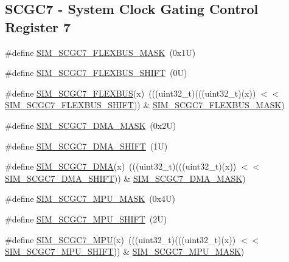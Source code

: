 \subsection*{S\+C\+G\+C7 -\/ System Clock Gating Control Register 7}
\begin{DoxyCompactItemize}
\item 
\#define \mbox{\hyperlink{group___s_i_m___register___masks_ga93f819afb387ad8aa57896e43ab0e795}{S\+I\+M\+\_\+\+S\+C\+G\+C7\+\_\+\+F\+L\+E\+X\+B\+U\+S\+\_\+\+M\+A\+SK}}~(0x1\+U)
\item 
\#define \mbox{\hyperlink{group___s_i_m___register___masks_ga624734f9006b5f488a9e1f789e1e3bde}{S\+I\+M\+\_\+\+S\+C\+G\+C7\+\_\+\+F\+L\+E\+X\+B\+U\+S\+\_\+\+S\+H\+I\+FT}}~(0\+U)
\item 
\#define \mbox{\hyperlink{group___s_i_m___register___masks_ga05d79d2b7b64bc3b4fa7c67b30fd5da3}{S\+I\+M\+\_\+\+S\+C\+G\+C7\+\_\+\+F\+L\+E\+X\+B\+US}}(x)~(((uint32\+\_\+t)(((uint32\+\_\+t)(x)) $<$$<$ \mbox{\hyperlink{group___s_i_m___register___masks_ga624734f9006b5f488a9e1f789e1e3bde}{S\+I\+M\+\_\+\+S\+C\+G\+C7\+\_\+\+F\+L\+E\+X\+B\+U\+S\+\_\+\+S\+H\+I\+FT}})) \& \mbox{\hyperlink{group___s_i_m___register___masks_ga93f819afb387ad8aa57896e43ab0e795}{S\+I\+M\+\_\+\+S\+C\+G\+C7\+\_\+\+F\+L\+E\+X\+B\+U\+S\+\_\+\+M\+A\+SK}})
\item 
\#define \mbox{\hyperlink{group___s_i_m___register___masks_gac559e129885604991932101719e3b368}{S\+I\+M\+\_\+\+S\+C\+G\+C7\+\_\+\+D\+M\+A\+\_\+\+M\+A\+SK}}~(0x2\+U)
\item 
\#define \mbox{\hyperlink{group___s_i_m___register___masks_ga1113f1622eb2e4099653e93943a89c6e}{S\+I\+M\+\_\+\+S\+C\+G\+C7\+\_\+\+D\+M\+A\+\_\+\+S\+H\+I\+FT}}~(1\+U)
\item 
\#define \mbox{\hyperlink{group___s_i_m___register___masks_gab654fa6242c7052090ea5e5aae4e5b18}{S\+I\+M\+\_\+\+S\+C\+G\+C7\+\_\+\+D\+MA}}(x)~(((uint32\+\_\+t)(((uint32\+\_\+t)(x)) $<$$<$ \mbox{\hyperlink{group___s_i_m___register___masks_ga1113f1622eb2e4099653e93943a89c6e}{S\+I\+M\+\_\+\+S\+C\+G\+C7\+\_\+\+D\+M\+A\+\_\+\+S\+H\+I\+FT}})) \& \mbox{\hyperlink{group___s_i_m___register___masks_gac559e129885604991932101719e3b368}{S\+I\+M\+\_\+\+S\+C\+G\+C7\+\_\+\+D\+M\+A\+\_\+\+M\+A\+SK}})
\item 
\#define \mbox{\hyperlink{group___s_i_m___register___masks_ga10319f9b82c284e2b8c0dbe633a8cc47}{S\+I\+M\+\_\+\+S\+C\+G\+C7\+\_\+\+M\+P\+U\+\_\+\+M\+A\+SK}}~(0x4\+U)
\item 
\#define \mbox{\hyperlink{group___s_i_m___register___masks_ga6e29c9922d73e340397f527f22dccd97}{S\+I\+M\+\_\+\+S\+C\+G\+C7\+\_\+\+M\+P\+U\+\_\+\+S\+H\+I\+FT}}~(2\+U)
\item 
\#define \mbox{\hyperlink{group___s_i_m___register___masks_gaa58dead9b7b361b440f4758f8206d15c}{S\+I\+M\+\_\+\+S\+C\+G\+C7\+\_\+\+M\+PU}}(x)~(((uint32\+\_\+t)(((uint32\+\_\+t)(x)) $<$$<$ \mbox{\hyperlink{group___s_i_m___register___masks_ga6e29c9922d73e340397f527f22dccd97}{S\+I\+M\+\_\+\+S\+C\+G\+C7\+\_\+\+M\+P\+U\+\_\+\+S\+H\+I\+FT}})) \& \mbox{\hyperlink{group___s_i_m___register___masks_ga10319f9b82c284e2b8c0dbe633a8cc47}{S\+I\+M\+\_\+\+S\+C\+G\+C7\+\_\+\+M\+P\+U\+\_\+\+M\+A\+SK}})
\end{DoxyCompactItemize}
